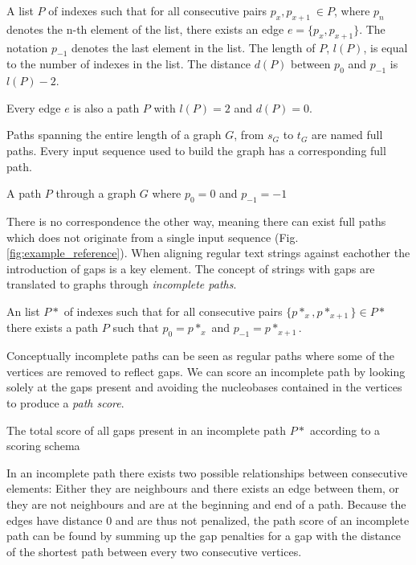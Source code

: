 \documentclass[thesis.tex]{subfiles}
\begin{document}
{\begin{defn}
  A list $P$ of indexes such that for all consecutive pairs $p_x, p_{x+1}\ \in P$, where $p_n$ denotes the n-th element of the list, there exists an edge $e=\{p_x, p_{x+1}\}$. The notation $p_{-1}$ denotes the last element in the list. The length of $P$, $l(P)$, is equal to the number of indexes in the list. The distance $d(P)$ between $p_0$ and $p_{-1}$ is $l(P) - 2$.
\end{defn}
\begin{corollary}
  Every edge $e$ is also a path $P$ with $l(P)=2$ and $d(P)=0$.
\end{corollary}
Paths spanning the entire length of a graph $G$, from $s_G$ to $t_G$ are named full paths. Every input sequence used to build the graph has a corresponding full path.
\begin{defn}
  A path $P$ through a graph $G$ where $p_0=0$ and $p_{-1}=-1$
\end{defn}
There is no correspondence the other way, meaning there can exist full paths which does not originate from a single input sequence (Fig. \ref{fig:example_reference}). When aligning regular text strings against eachother the introduction of gaps is a key element. The concept of strings with gaps are translated to graphs through \textit{incomplete paths}.
\begin{defn}
  An list $P*$ of indexes such that for all consecutive pairs $\{p*_x, p*_{x+1}\} \in P*$ there exists a path $P$ such that $p_0=p*_x$ and $p_{-1}=p*_{x+1}$.
\end{defn}
Conceptually incomplete paths can be seen as regular paths where some of the vertices are removed to reflect gaps. We can score an incomplete path by looking solely at the gaps present and avoiding the nucleobases contained in the vertices to produce a \textit{path score}. 
\begin{defn}
  The total score of all gaps present in an incomplete path $P*$ according to a scoring schema
\end{defn}
In an incomplete path there exists two possible relationships between consecutive elements: Either they are neighbours and there exists an edge between them, or they are not neighbours and are at the beginning and end of a path. Because the edges have distance $0$ and are thus not penalized, the path score of an incomplete path can be found by summing up the gap penalties for a gap with the distance of the shortest path between every two consecutive vertices.
}
\end{document}
